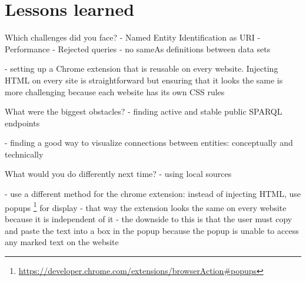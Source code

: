 \section{Lessons learned}
Which challenges did you face?
- Named Entity Identification as URI
- Performance
- Rejected queries
- no sameAs definitions between data sets

- setting up a Chrome extension that is reusable on every website. Injecting HTML on every site is straightforward but ensuring that it looks the same is more challenging because each website has its own CSS rules


What were the biggest obstacles?
- finding active and stable public SPARQL endpoints

- finding a good way to visualize connections between entities: conceptually and technically


What would you do differently next time?
- using local sources

- use a different method for the chrome extension: instead of injecting HTML, use popups \footnote{\url{https://developer.chrome.com/extensions/browserAction\#popups}} for display
- that way the extension looks the same on every website because it is independent of it
- the downside to this is that the user must copy and paste the text into a box in the popup because the popup is unable to access any marked text on the website

